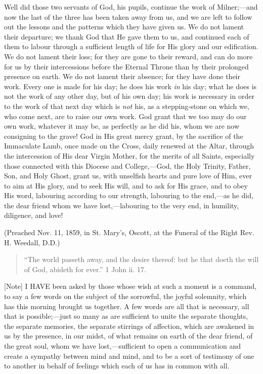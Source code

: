 Well did those two servants of God, his pupils,
continue the work of Milner;—and now the last of the
three has been taken away from us, and we are left to
follow out the lessons and the patterns which they have
given us. We do not lament their departure; we thank God
that He gave them to us, and continued each of them to
labour through a sufficient length of life for His glory
and our edification. We do not lament their loss; for
they are gone to their reward, and can do more for us by
their intercessions before the Eternal Throne than by
their prolonged presence on earth. We do not lament their
absence; for they have done their work. Every one is made
for his day; he does his work \emph{in} his day; what he
does is not the work of any other day, but of his own
day; his work is necessary in order to the work of that
next day which is \emph{not} his, as a stepping-stone on
which we, who come next, are to raise our own work. God
grant that we too may do our own work, whatever it may
be, as perfectly as he did his, whom we are now
consigning to the grave! God in His great mercy grant, by
the sacrifice of the Immaculate Lamb, once made on the
Cross, daily renewed at the Altar, through the
intercession of His dear Virgin Mother, for the merits of
all Saints, especially those connected with this Diocese
and College,—God, the Holy Trinity, Father, Son, and
Holy Ghost, grant us, with unselfish hearts and pure love
of Him, ever to aim at His glory, and to seek His will,
and to ask for His grace, and to obey His word, labouring
according to our strength, labouring to the end,—as
he did, the dear friend whom we have lost,—labouring
to the very end, in humility, diligence, and love!

(Preached Nov. 11, 1859, in St. Mary's, Oscott, at the
Funeral of the Right Rev. H. Weedall, D.D.)


\begin{quote}

``The world passeth away, and the desire
thereof: but he that doeth the will of God, abideth
for ever.'' 1 John ii. 17.

\end{quote}

[Note] I HAVE been asked by those whose wish at such a moment
is a command, to say a few words on the subject of the
sorrowful, the joyful solemnity, which has this morning
brought us together. A few words are all that is
necessary, all that is possible;—just so many as are
sufficient to unite the separate thoughts, the separate memories, the separate stirrings of affection, which are
awakened in us by the presence, in our midst, of what
remains on earth of the dear friend, of the great soul,
whom we have lost,—sufficient to open a
communication and create a sympathy between mind and
mind, and to be a sort of testimony of one to another in
behalf of feelings which each of us has in common with
all.

